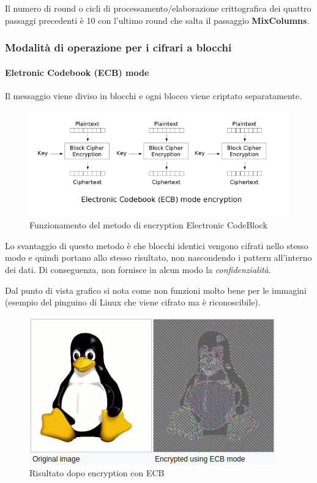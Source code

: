 Il numero di round o cicli di processamento/elaborazione crittografica dei quattro passaggi precedenti è 10 con l'ultimo round che salta il passaggio \textbf{MixColumns}.

\subsubsection{Modalità di operazione per i cifrari a blocchi}

\paragraph{Eletronic Codebook (ECB) mode}

Il messaggio viene diviso in blocchi e ogni blocco viene criptato separatamente.

\begin{figure}[H]
\centering
\includegraphics[scale=0.65]{res/img/ecb.png}
\caption{Funzionamento del metodo di encryption Electronic CodeBlock}
\label{fig:password:ecb}
\end{figure}

Lo svantaggio di questo metodo è che blocchi identici vengono cifrati nello
stesso modo e quindi portano allo stesso risultato, non nascondendo i pattern
all'interno dei dati. Di conseguenza, non fornisce in alcun modo la
\textit{confidenzialità}.

Dal punto di vista grafico si nota come non funzioni molto bene per le
immagini (esempio del pinguino di Linux che viene cifrato ma è riconoscibile).

\begin{figure}[H]
\centering
\includegraphics[scale=0.65]{res/img/password_linux.png}
\caption{Risultato dopo encryption con ECB}
\label{fig:password:linux_ecb}
\end{figure}

